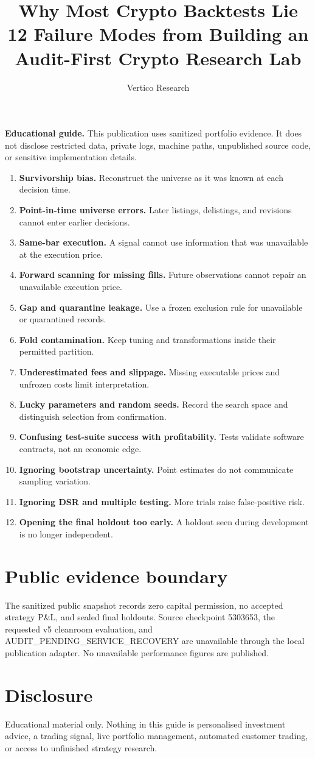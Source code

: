 \documentclass[11pt]{article}
\title{Why Most Crypto Backtests Lie\\\large 12 Failure Modes from Building an Audit-First Crypto Research Lab}
\author{Vertico Research}
\date{}
\begin{document}
\maketitle
\noindent\textbf{Educational guide.} This publication uses sanitized portfolio evidence. It does not disclose restricted data, private logs, machine paths, unpublished source code, or sensitive implementation details.
\begin{enumerate}
\item \textbf{Survivorship bias.} Reconstruct the universe as it was known at each decision time.
\item \textbf{Point-in-time universe errors.} Later listings, delistings, and revisions cannot enter earlier decisions.
\item \textbf{Same-bar execution.} A signal cannot use information that was unavailable at the execution price.
\item \textbf{Forward scanning for missing fills.} Future observations cannot repair an unavailable execution price.
\item \textbf{Gap and quarantine leakage.} Use a frozen exclusion rule for unavailable or quarantined records.
\item \textbf{Fold contamination.} Keep tuning and transformations inside their permitted partition.
\item \textbf{Underestimated fees and slippage.} Missing executable prices and unfrozen costs limit interpretation.
\item \textbf{Lucky parameters and random seeds.} Record the search space and distinguish selection from confirmation.
\item \textbf{Confusing test-suite success with profitability.} Tests validate software contracts, not an economic edge.
\item \textbf{Ignoring bootstrap uncertainty.} Point estimates do not communicate sampling variation.
\item \textbf{Ignoring DSR and multiple testing.} More trials raise false-positive risk.
\item \textbf{Opening the final holdout too early.} A holdout seen during development is no longer independent.
\end{enumerate}
\section*{Public evidence boundary}
The sanitized public snapshot records zero capital permission, no accepted strategy P\&L, and sealed final holdouts. Source checkpoint 5303653, the requested v5 cleanroom evaluation, and AUDIT\_PENDING\_SERVICE\_RECOVERY are unavailable through the local publication adapter. No unavailable performance figures are published.
\section*{Disclosure}
Educational material only. Nothing in this guide is personalised investment advice, a trading signal, live portfolio management, automated customer trading, or access to unfinished strategy research.
\end{document}
